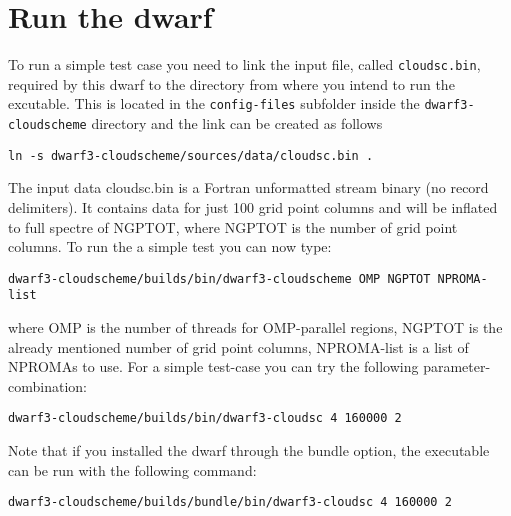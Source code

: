 \documentclass[
a4paper,     %
12pt,        %
article,
onecolumn,   %
openany,     %
]{memoir}
\newcommand{\inlsh}[1]{\texttt{#1}}
\newcommand{\inlsh}[1]{\tikz[anchor=base,baseline]\node[inner sep=2pt,
outer sep=0,draw=yellow!10,fill=yellow!10]{\texttt{#1}};}
\begin{document}


\section{Run the dwarf}
To run a simple test case you need to link the input file, called \inlsh{cloudsc.bin}, 
required by this dwarf to the directory from where you intend to run the excutable.
This is located in the \inlsh{config-files} subfolder inside the \inlsh{dwarf3-cloudscheme} 
directory and the link can be created as follows
%
\begin{lstlisting}[style=BashStyle]
ln -s dwarf3-cloudscheme/sources/data/cloudsc.bin .
\end{lstlisting}
%
The input data cloudsc.bin is a Fortran unformatted stream binary (no record delimiters). 
It contains data for just 100 grid point columns and will be inflated to full spectre 
of NGPTOT, where NGPTOT is the number of grid point columns.
To run the a simple test you can now type:
%
\begin{lstlisting}[style=BashStyle]
dwarf3-cloudscheme/builds/bin/dwarf3-cloudscheme OMP NGPTOT NPROMA-list
\end{lstlisting}
%
where OMP is the number of threads for OMP-parallel regions, NGPTOT is the already 
mentioned number of grid point columns, NPROMA-list is a list of NPROMAs to use.
For a simple test-case you can try the following parameter-combination:
%
\begin{lstlisting}[style=BashStyle]
dwarf3-cloudscheme/builds/bin/dwarf3-cloudsc 4 160000 2
\end{lstlisting}
%
Note that if you installed the dwarf through the bundle option, the executable 
can be run with the following command:
%
\begin{lstlisting}[style=BashStyle]
dwarf3-cloudscheme/builds/bundle/bin/dwarf3-cloudsc 4 160000 2
\end{lstlisting}
%
\end{document}
